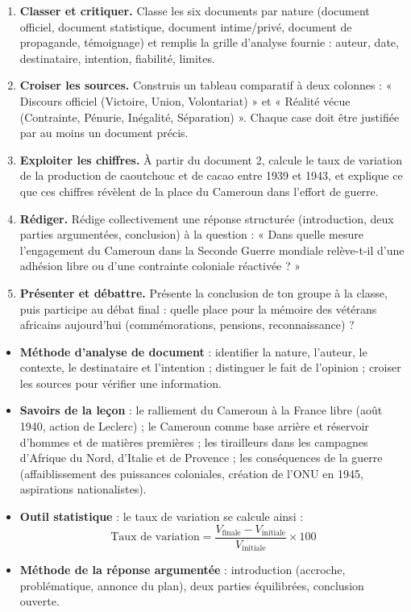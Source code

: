 \documentclass[11pt]{article}
\newcounter{popsec}
\newcounter{popsub}
\newcommand{\courssub}[1]{%
  \stepcounter{popsub}%
  \par\vspace{9pt}\noindent{\popxbold\fontsize{11.5}{13}\selectfont\color{popink}{\color{poporange}\thepopsec.\thepopsub}\hspace{6pt}#1}\par\nopagebreak\vspace{4pt}
}
\begin{document}
\begin{enumerate}
\item \textbf{Classer et critiquer.} Classe les six documents par nature (document officiel, document statistique, document intime/privé, document de propagande, témoignage) et remplis la grille d'analyse fournie : auteur, date, destinataire, intention, fiabilité, limites.
\item \textbf{Croiser les sources.} Construis un tableau comparatif à deux colonnes : « Discours officiel (Victoire, Union, Volontariat) » et « Réalité vécue (Contrainte, Pénurie, Inégalité, Séparation) ». Chaque case doit être justifiée par au moins un document précis.
\item \textbf{Exploiter les chiffres.} À partir du document 2, calcule le taux de variation de la production de caoutchouc et de cacao entre 1939 et 1943, et explique ce que ces chiffres révèlent de la place du Cameroun dans l'effort de guerre.
\item \textbf{Rédiger.} Rédige collectivement une réponse structurée (introduction, deux parties argumentées, conclusion) à la question : « Dans quelle mesure l'engagement du Cameroun dans la Seconde Guerre mondiale relève-t-il d'une adhésion libre ou d'une contrainte coloniale réactivée ? »
\item \textbf{Présenter et débattre.} Présente la conclusion de ton groupe à la classe, puis participe au débat final : quelle place pour la mémoire des vétérans africains aujourd'hui (commémorations, pensions, reconnaissance) ?
\end{enumerate}

\courssub{Ressources à mobiliser}

\begin{aretenir}
\begin{itemize}
\item \textbf{Méthode d'analyse de document} : identifier la nature, l'auteur, le contexte, le destinataire et l'intention ; distinguer le fait de l'opinion ; croiser les sources pour vérifier une information.
\item \textbf{Savoirs de la leçon} : le ralliement du Cameroun à la France libre (août 1940, action de Leclerc) ; le Cameroun comme base arrière et réservoir d'hommes et de matières premières ; les tirailleurs dans les campagnes d'Afrique du Nord, d'Italie et de Provence ; les conséquences de la guerre (affaiblissement des puissances coloniales, création de l'ONU en 1945, aspirations nationalistes).
\item \textbf{Outil statistique} : le taux de variation se calcule ainsi :
\[ \text{Taux de variation} = \frac{V_{\text{finale}} - V_{\text{initiale}}}{V_{\text{initiale}}} \times 100 \]
\item \textbf{Méthode de la réponse argumentée} : introduction (accroche, problématique, annonce du plan), deux parties équilibrées, conclusion ouverte.
\end{itemize}
\end{aretenir}
\end{document}
